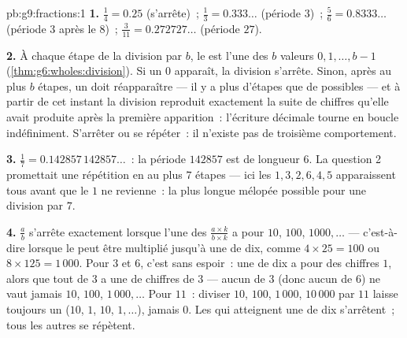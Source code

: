 \begin{solution}{pb:g9:fractions:1}
\textbf{1.} $\frac14 = 0.25$ (s'arrête)~; $\frac13 = 0.333\ldots$
(période $3$)~; $\frac56 = 0.8333\ldots$ (période $3$ après le
$8$)~; $\frac{3}{11} = 0.272727\ldots$ (période $27$).

\textbf{2.} À chaque étape de la division par $b$, le  est
l'une des $b$ valeurs $0, 1, \dots, b - 1$
(\cref{thm:g6:wholes:division}). Si un  $0$ apparaît, la
division s'arrête. Sinon, après au plus $b$ étapes, un  doit
réapparaître --- il y a plus d'étapes que de  possibles --- et
à partir de cet instant la division reproduit exactement la suite de
chiffres qu'elle avait produite après la première apparition~:
l'écriture décimale tourne en boucle indéfiniment. S'arrêter ou se
répéter~: il n'existe pas de troisième comportement.

\textbf{3.} $\frac17 = 0.142857\,142857\ldots$~: la période
$142857$ est de longueur $6$. La question 2 promettait une
répétition en au plus $7$ étapes --- ici les 
$1, 3, 2, 6, 4, 5$ apparaissent tous avant que le $1$ ne revienne~:
la plus longue mélopée possible pour une division par $7$.

\textbf{4.} $\frac ab$ s'arrête exactement lorsque l'une des
 $\frac{a \times k}{b \times k}$ a pour  $10$,
$100$, $1000, \dots$ --- c'est-à-dire lorsque le  peut
être multiplié jusqu'à une  de dix, comme
$4 \times 25 = 100$ ou $8 \times 125 = 1\,000$. Pour $3$ et $6$,
c'est sans espoir~: une  de dix a pour  des chiffres
$1$, alors que tout  de $3$ a une  de chiffres 
de $3$ --- aucun  de $3$ (donc aucun de $6$) ne vaut jamais
$10$, $100$, $1\,000, \dots$ Pour $11$~: diviser $10$, $100$,
$1\,000$, $10\,000$ par $11$ laisse toujours un  ($10$, $1$,
$10$, $1, \dots$), jamais $0$. Les  qui atteignent une
 de dix s'arrêtent~; tous les autres se répètent.


\end{solution}
